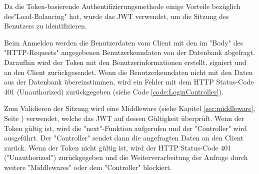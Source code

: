 
Da die Token-basierende Authentifizierungsmethode einige Vorteile bezüglich des\linebreak "Load-Balancing" hat, wurde das JWT verwendet, um die Sitzung des Benutzers zu identifizieren.



Beim Anmelden werden die Benutzerdaten vom Client mit den im "Body" des "HTTP-Requests" angegebenen Benutzerkenndaten von der Datenbank abgefragt. 
Daraufhin wird der Token mit den Benutzerinformationen erstellt, signiert und an den Client zurückgesendet. 
Wenn die Benutzerkenndaten nicht mit den Daten aus der Datenbank übereinstimmen, wird ein Fehler mit dem HTTP Status-Code 401 (Unauthorized) zurückgegeben (siehe Code \ref{code:LoginController}).


\pagebreak
{}

Zum Validieren der Sitzung wird eine Middleware (siehe Kapitel \ref{sec:middleware}, Seite \pageref{sec:middleware}) verwendet, welche das JWT auf dessen Gültigkeit überprüft. 
Wenn der Token gültig ist, wird die "next"-Funktion aufgerufen und der "Controller" wird ausgeführt. Der "Controller" sendet dann die angefragten Daten an den Client zurück. 
Wenn der Token nicht gültig ist, wird der HTTP Status-Code 401 ("Unauthorized") zurückgegeben und die Weiterverarbeitung der Anfrage durch weitere "Middlewares" oder dem "Controller" blockiert.

